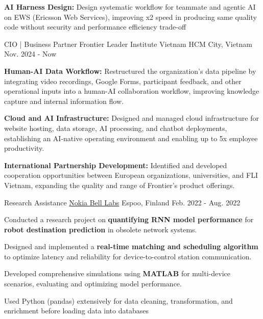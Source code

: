 \begin{cventries}
{\begin{cvitems}
                    \item \textbf{AI Harness Design:} Design systematic workflow for teammate and agentic AI on EWS (Ericsson Web Services), improving x2 speed in producing same quality code without security and performance efficiency trade-off
                \end{cvitems}
            }
     \vspace{4mm}
    \cventry
            {CIO | Business Partner} %
            {Frontier Leader Institute Vietnam} %
            {HCM City, Vietnam} %
            {Nov. 2024 - Now} %
            {
                \begin{cvitems} %
                    \item \textbf{Human-AI Data Workflow:} Restructured the organization's data pipeline by integrating video recordings, Google Forms, participant feedback, and other operational inputs into a human-AI collaboration workflow, improving knowledge capture and internal information flow.
                    \item \textbf{Cloud and AI Infrastructure:} Designed and managed cloud infrastructure for website hosting, data storage, AI processing, and chatbot deployments, establishing an AI-native operating environment and enabling up to 5x employee productivity.
                    \item \textbf{International Partnership Development:} Identified and developed cooperation opportunities between European organizations, universities, and FLI Vietnam, expanding the quality and range of Frontier's product offerings.
                \end{cvitems}
            }
    \vspace{4mm}

    \cventry
            {Research Assistance} %
            {\href{https://www.bell-labs.com}{Nokia Bell Labs}} %
            {Espoo, Finland} %
            {Feb. 2022 - Aug. 2022} %
            {
                \begin{cvitems}
                    \item Conducted a research project on \textbf{quantifying RNN model performance} for \textbf{robot destination prediction} in obsolete network systems.
                    \item Designed and implemented a \textbf{real-time matching and scheduling algorithm} to optimize latency and reliability for device-to-control station communication.
                    \item Developed comprehensive simulations using \textbf{MATLAB} for multi-device scenarios, evaluating and optimizing model performance.
                    \item Used Python (pandas) extensively for data cleaning, transformation, and enrichment before loading data into databases
                \end{cvitems}
            }
    \vspace{4mm}


\end{cventries}
